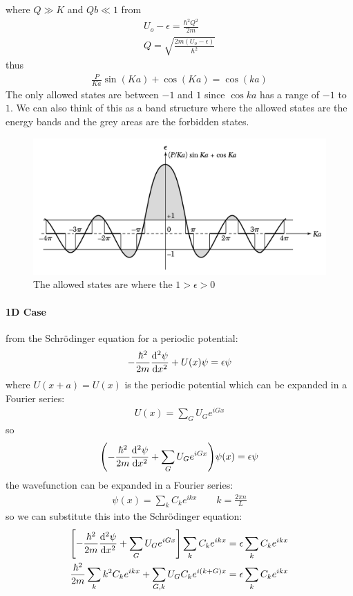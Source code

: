 \documentclass[../main.tex]{subfiles}
\begin{document}
where $Q \gg K$ and $Qb \ll 1$ from 
\begin{align*}
    U_o - \epsilon = \frac{\hbar^2 Q^2}{2m} \\
    Q = \sqrt{\frac{2m(U_o - \epsilon)}{\hbar^2}}
\end{align*}
thus 
\begin{align*}
    \frac{P}{Ka} \sin(Ka) + \cos(Ka) = \cos(ka)
\end{align*}
\newpage
The only allowed states are between $-1$ and $1$ since $\cos{ka}$ has a range of $-1$ to $1$. We 
can also think of this as a band structure where the allowed states are the energy bands and the
grey areas are the forbidden states.
\begin{figure}[ht]
    \centering
    \includegraphics[width=0.6\linewidth]{kpmodel.png}
    \caption{The allowed states are where the $1 > \epsilon > 0$}
    \label{fig:7.1}
\end{figure}

\paragraph*{1D Case} from the Schr\"odinger equation for a periodic potential:
\begin{align*}
    -\frac{\hbar^2}{2m} \dv[2]{\psi}{x} + U(x) \psi = \epsilon \psi
\end{align*}
where $U(x + a) = U(x)$ is the periodic potential which can be expanded in a Fourier series:
\begin{align*}
    U(x) = \sum_G U_G e^{iGx}
\end{align*}
so 
\begin{align*}
    \qt(-\frac{\hbar^2}{2m} \dv[2]{\psi}{x} + \sum_G U_G e^{iGx}) \psi(x) = \epsilon \psi
\end{align*}
the wavefunction can be expanded in a Fourier series:
\begin{align*}
    \psi(x) = \sum_k C_k e^{ikx} \qquad k = \frac{2\pi n}{L}
\end{align*}
so we can substitute this into the Schr\"odinger equation:
\begin{align*}
    \qt[-\frac{\hbar^2}{2m} \dv[2]{\psi}{x}+ \sum_G U_G e^{iGx}] \sum_k C_k e^{ikx} = \epsilon \sum_k C_k e^{ikx} \\
    \frac{\hbar^2}{2m} \sum_k k^2 C_k e^{ikx} + \sum_{G, k} U_G C_k e^{i(k+G)x} = \epsilon \sum_k C_k e^{ikx}
\end{align*}
\end{document}
